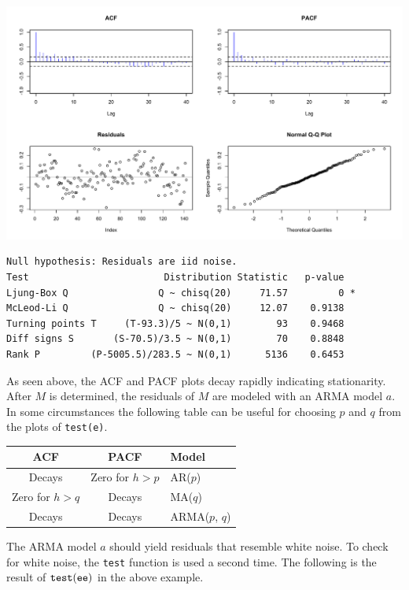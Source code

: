 \documentclass[12pt]{article}
\begin{document}
\begin{center}
\includegraphics[scale=0.3]{Rplot-5.pdf}
\end{center}

\begin{verbatim}
Null hypothesis: Residuals are iid noise.
Test                        Distribution Statistic   p-value
Ljung-Box Q                Q ~ chisq(20)     71.57         0 *
McLeod-Li Q                Q ~ chisq(20)     12.07    0.9138
Turning points T     (T-93.3)/5 ~ N(0,1)        93    0.9468
Diff signs S       (S-70.5)/3.5 ~ N(0,1)        70    0.8848
Rank P         (P-5005.5)/283.5 ~ N(0,1)      5136    0.6453
\end{verbatim}

As seen above, the ACF and PACF plots decay rapidly indicating stationarity.
After $M$ is determined, the residuals of $M$ are
modeled with an ARMA model $a$.
In some circumstances
the following table can be useful for choosing $p$ and $q$ from the
plots of \verb$test(e)$.

\begin{center}
\begin{tabular}{|c|c|l|}
\hline
ACF & PACF & Model\\
\hline
Decays & Zero for $h>p$ & AR($p$)\\
Zero for $h>q$ & Decays & MA($q$)\\
Decays & Decays & ARMA($p$, $q$)\\
\hline
\end{tabular}
\end{center}

The ARMA model $a$ should yield residuals that resemble white noise.
To check for white noise, the {\tt test} function is used a second time.
The following is the result of $\tt test(ee)$ in the above example.
\end{document}
